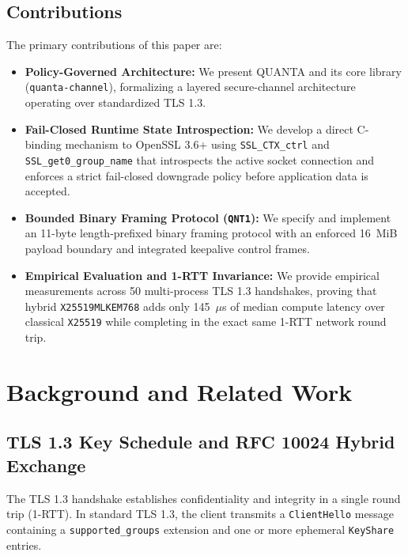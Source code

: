 \documentclass[conference]{IEEEtran}
\begin{document}
\subsection{Contributions}
The primary contributions of this paper are:
\begin{itemize}
    \item \textbf{Policy-Governed Architecture:} We present QUANTA and its core library (\texttt{quanta-channel}), formalizing a layered secure-channel architecture operating over standardized TLS 1.3.
    \item \textbf{Fail-Closed Runtime State Introspection:} We develop a direct C-binding mechanism to OpenSSL 3.6+ using \texttt{SSL\_CTX\_ctrl} and \texttt{SSL\_get0\_group\_name} that introspects the active socket connection and enforces a strict fail-closed downgrade policy before application data is accepted.
    \item \textbf{Bounded Binary Framing Protocol (\texttt{QNT1}):} We specify and implement an 11-byte length-prefixed binary framing protocol with an enforced 16~MiB payload boundary and integrated keepalive control frames.
    \item \textbf{Empirical Evaluation and 1-RTT Invariance:} We provide empirical measurements across 50 multi-process TLS 1.3 handshakes, proving that hybrid \texttt{X25519MLKEM768} adds only 145~$\mu$s of median compute latency over classical \texttt{X25519} while completing in the exact same 1-RTT network round trip.
\end{itemize}

\section{Background and Related Work}

\subsection{TLS 1.3 Key Schedule and RFC 10024 Hybrid Exchange}
The TLS 1.3 handshake \cite{rfc8446} establishes confidentiality and integrity in a single round trip (1-RTT). In standard TLS 1.3, the client transmits a \texttt{ClientHello} message containing a \texttt{supported\_groups} extension and one or more ephemeral \texttt{KeyShare} entries.
\end{document}
